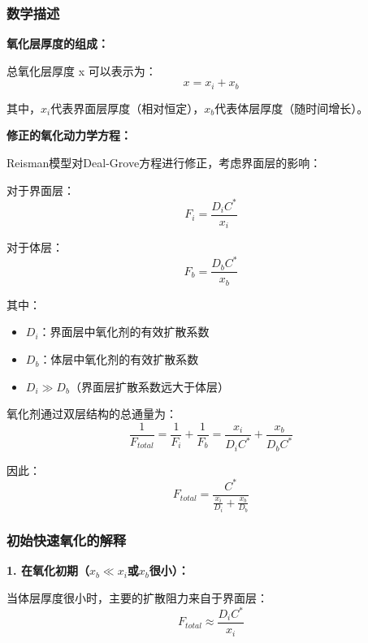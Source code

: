 \documentclass[UTF8,12pt,a4paper]{ctexart}
\begin{document}
\subsubsection{数学描述}

\textbf{氧化层厚度的组成：}

总氧化层厚度 x 可以表示为：
\begin{equation}
x = x_i + x_b
\end{equation}

其中，$x_i$代表界面层厚度（相对恒定），$x_b$代表体层厚度（随时间增长）。

\textbf{修正的氧化动力学方程：}

Reisman模型对Deal-Grove方程进行修正，考虑界面层的影响：

对于界面层：
\begin{equation}
F_i = \frac{D_i C^*}{x_i}
\end{equation}

对于体层：
\begin{equation}
F_b = \frac{D_b C^*}{x_b}
\end{equation}

其中：
\begin{itemize}
    \item $D_i$：界面层中氧化剂的有效扩散系数
    \item $D_b$：体层中氧化剂的有效扩散系数
    \item $D_i \gg D_b$（界面层扩散系数远大于体层）
\end{itemize}

氧化剂通过双层结构的总通量为：
\begin{equation}
\frac{1}{F_{total}} = \frac{1}{F_i} + \frac{1}{F_b} = \frac{x_i}{D_i C^*} + \frac{x_b}{D_b C^*}
\end{equation}

因此：
\begin{equation}
F_{total} = \frac{C^*}{\frac{x_i}{D_i} + \frac{x_b}{D_b}}
\end{equation}

\subsubsection{初始快速氧化的解释}

\textbf{1. 在氧化初期（$x_b \ll x_i$或$x_b$很小）：}

当体层厚度很小时，主要的扩散阻力来自于界面层：
\begin{equation}
F_{total} \approx \frac{D_i C^*}{x_i}
\end{equation}
\end{document}
